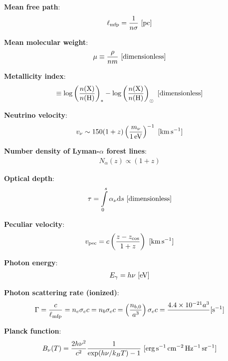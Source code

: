 \documentclass[a4paper,11pt]{article}
\begin{document}
{\noindent}\textbf{Mean free path}:
\begin{align*}
    \ell_\mathrm{mfp} = \dfrac{1}{n\sigma} ~ [{\rm pc}]
\end{align*}

{\noindent}\textbf{Mean molecular weight}:
\begin{align*}
    \mu \equiv \frac{\rho}{nm} ~ [{\rm dimensionless}]
\end{align*}

{\noindent}\textbf{Metallicity index}:
\begin{align*}
    [\mathrm{X}/\mathrm{H}] \equiv \log\left(\frac{n(\mathrm{X})}{n(\mathrm{H})}\right)_* -\log\left(\frac{n(\mathrm{X})}{n(\mathrm{H})}\right)_\odot ~ [{\rm dimensionless}]
\end{align*}

{\noindent}\textbf{Neutrino velocity}:
\begin{align*}
    v_\nu \sim 150(1+z)\left(\frac{m_\nu}{1\,{\rm eV}}\right)^{-1} ~ [{\rm km\,s^{-1}}]
\end{align*}

{\noindent}\textbf{Number density of Lyman-$\alpha$ forest lines}:
\begin{align*}
    N_\alpha(z) \propto (1+z)
\end{align*}

{\noindent}\textbf{Optical depth}:
\begin{align*}
    \tau = \int\limits_0^s \alpha_\nu\mathrm{d}s ~ [{\rm dimensionless}]
\end{align*}

{\noindent}\textbf{Peculiar velocity}:
\begin{align*}
    v_{\rm pec} = c\left(\frac{z-z_\mathrm{cos}}{1+z}\right) ~ [{\rm km\,s^{-1}}]
\end{align*}

{\noindent}\textbf{Photon energy}:
\begin{align*}
    E_\gamma = h\nu ~ [{\rm eV}]
\end{align*}

{\noindent}\textbf{Photon scattering rate (ionized)}:
\begin{align*}
    \Gamma = \dfrac{c}{\ell_\mathrm{mfp}} = n_e\sigma_ec = n_b\sigma_ec = \left(\dfrac{n_{b,0}}{a^3}\right)\sigma_ec = \dfrac{4.4\times10^{-21}{a^3}} ~ [{\rm s^{-1}}]
\end{align*}

{\noindent}\textbf{Planck function}:
\begin{align*}
    B_\nu(T) = \frac{2h\nu^2}{c^2} \frac{1}{\exp(h\nu/k_BT) - 1} ~ [{\rm erg\,s^{-1}\,cm^{-2}\,Hz^{-1}\,sr^{-1}}]
\end{align*}
\end{document}
